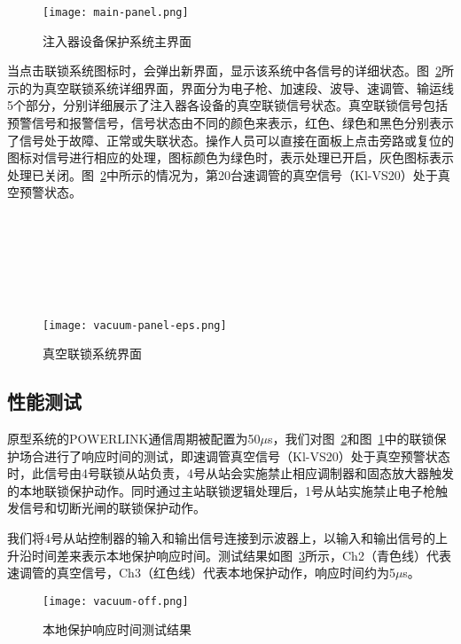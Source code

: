 \begin{figure}[!htb]
	\centering
	\texttt{[image: main-panel.png]}
	\caption{注入器设备保护系统主界面}
	\label{fig:main-panel}
\end{figure}

当点击联锁系统图标时，会弹出新界面，显示该系统中各信号的详细状态。图~\ref{fig:vacuum-panel-eps}所示的为真空联锁系统详细界面，界面分为电子枪、加速段、波导、速调管、输运线5个部分，分别详细展示了注入器各设备的真空联锁信号状态。真空联锁信号包括预警信号和报警信号，信号状态由不同的颜色来表示，红色、绿色和黑色分别表示了信号处于故障、正常或失联状态。操作人员可以直接在面板上点击旁路或复位的图标对信号进行相应的处理，图标颜色为绿色时，表示处理已开启，灰色图标表示处理已关闭。图~\ref{fig:vacuum-panel-eps}中所示的情况为，第20台速调管的真空信号（Kl-VS20）处于真空预警状态。
\\
\\
\\
\\
\\
\\
\\

\begin{figure}[!htb]
	\centering
	\texttt{[image: vacuum-panel-eps.png]}
	\caption{真空联锁系统界面}
	\label{fig:vacuum-panel-eps}
\end{figure}

\subsection{性能测试}

原型系统的POWERLINK通信周期被配置为50$\mu$s，我们对图~\ref{fig:vacuum-panel-eps}和图~\ref{fig:main-panel}中的联锁保护场合进行了响应时间的测试，即速调管真空信号（Kl-VS20）处于真空预警状态时，此信号由4号联锁从站负责，4号从站会实施禁止相应调制器和固态放大器触发的本地联锁保护动作。同时通过主站联锁逻辑处理后，1号从站实施禁止电子枪触发信号和切断光闸的联锁保护动作。

我们将4号从站控制器的输入和输出信号连接到示波器上，以输入和输出信号的上升沿时间差来表示本地保护响应时间。测试结果如图~\ref{fig:vacuum-off}所示，Ch2（青色线）代表速调管的真空信号，Ch3（红色线）代表本地保护动作，响应时间约为5$\mu$s。

\begin{figure}[!htb]
	\centering
	\texttt{[image: vacuum-off.png]}
	\caption{本地保护响应时间测试结果}
	\label{fig:vacuum-off}
\end{figure}

